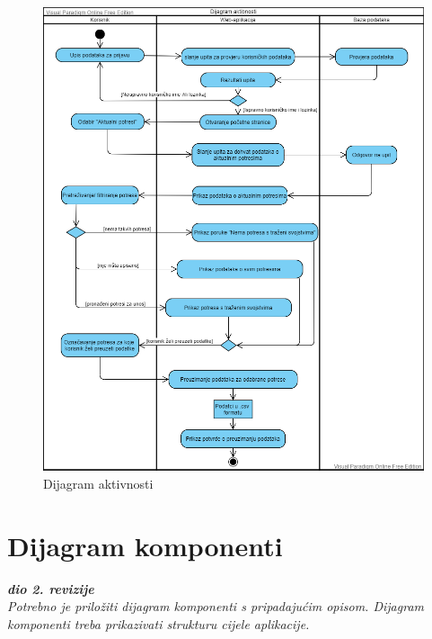 		\begin{figure}[H]
			\includegraphics[width=\textwidth]{slike/dijagram_aktivnosti.png}
			\caption{Dijagram aktivnosti}
			\label{fig:uml_db} 
		\end{figure}
		
			
			\eject
		\section{Dijagram komponenti}
		
			\textbf{\textit{dio 2. revizije}}\\
		
			 \textit{Potrebno je priložiti dijagram komponenti s pripadajućim opisom. Dijagram komponenti treba prikazivati strukturu cijele aplikacije.}
		\eject